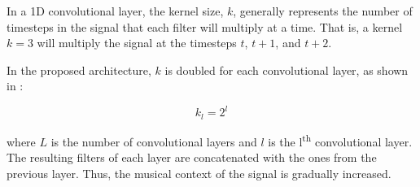 
In a 1D convolutional layer, the kernel size, $k$, generally
represents the number of timesteps in the signal that each
filter will multiply at a time. That is, a kernel $k=3$ will
multiply the signal at the timesteps $t$, $t+1$, and $t+2$.

In the proposed architecture, $k$ is doubled for each
convolutional layer, as shown in :

\begin{equation}
    \label{eq:kernel_size}
    k_l = 2^{l}
\end{equation}

where $L$ is the number of convolutional layers and $l$ is
the l\textsuperscript{th} convolutional layer. The resulting
filters of each layer are concatenated with the ones from
the previous layer. Thus, the musical context of the signal
is gradually increased.
